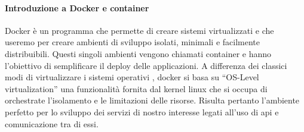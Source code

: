\paragraph{Introduzione a Docker e container}
Docker è un programma che permette di creare sistemi virtualizzati e che useremo per creare ambienti di sviluppo isolati, minimali e facilmente distribuibili. Questi singoli ambienti vengono chiamati container e hanno l’obiettivo di  semplificare il deploy delle applicazioni. A differenza dei classici modi di virtualizzare i sistemi operativi , docker si basa su “OS-Level virtualization” una funzionalità fornita dal kernel linux che si occupa di orchestrate l’isolamento e le limitazioni delle risorse.
Risulta pertanto l’ambiente perfetto per lo sviluppo dei servizi di nostro interesse legati all’uso di api e comunicazione tra di essi. 

